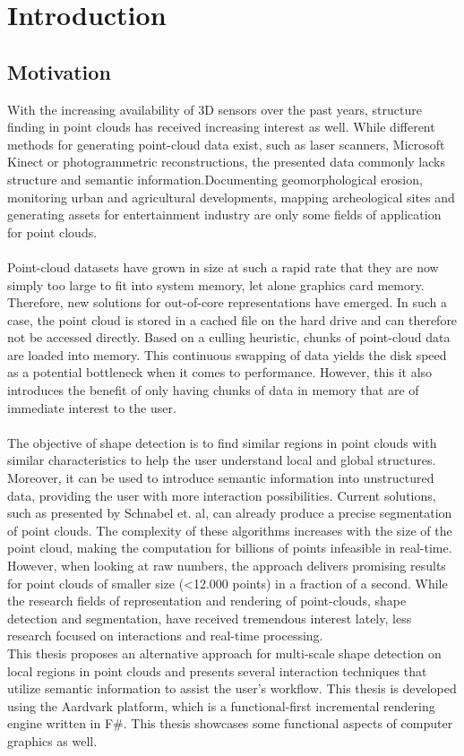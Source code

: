 \chapter{Introduction}
\newpage

\section{Motivation}

With the increasing availability of 3D sensors over the past years, structure finding in point clouds has received increasing interest as well. While different methods for generating point-cloud data exist, such as laser scanners, Microsoft Kinect or photogrammetric reconstructions, the presented data commonly lacks structure and semantic information.Documenting geomorphological erosion, monitoring urban and agricultural developments, mapping archeological sites and generating assets for entertainment industry are only some fields of application for point clouds. 
\\
\\
Point-cloud datasets have grown in size at such a rapid rate that they are now simply too large to fit into system memory, let alone graphics card memory. Therefore, new solutions for out-of-core representations have emerged. In such a case, the point cloud is stored in a cached file on the hard drive and can therefore not be accessed directly. Based on a culling heuristic, chunks of point-cloud data are loaded into memory. This continuous swapping of data yields the disk speed as a potential bottleneck when it comes to performance. However, this it also introduces the benefit of only having chunks of data in memory that are of immediate interest to the user. 
\\
\\
The objective of shape detection is to find similar regions in point clouds with similar characteristics to help the user understand local and global structures. Moreover, it can be used to introduce semantic information into unstructured data, providing the user with more interaction possibilities. Current solutions, such as presented by Schnabel et. al\cite{schnabel-2007-efficient}\cite{schnabel-2007-ransac}, can already produce a precise segmentation of point clouds. The complexity of these algorithms increases with the size of the point cloud, making the computation for billions of points infeasible in real-time. However, when looking at raw numbers, the approach delivers promising results for point clouds of smaller size (<12.000 points) in a fraction of a second.
While the research fields of representation and rendering of point-clouds, shape detection and segmentation, have received tremendous interest lately, less research focused on interactions and real-time processing. 
\\
This thesis proposes an alternative approach for multi-scale shape detection on local regions in point clouds and presents several interaction techniques that utilize semantic information to assist the user's workflow. This thesis is developed using the Aardvark platform, which is a functional-first incremental rendering engine written in F\#. This thesis showcases some functional aspects of computer graphics as well. 


